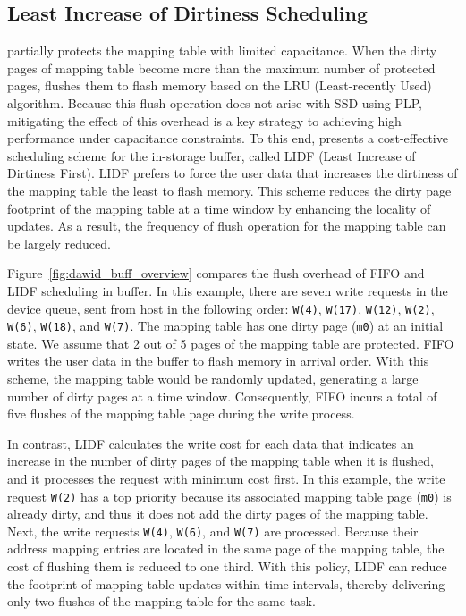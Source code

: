 

\subsection{Least Increase of Dirtiness Scheduling}
\label{subsec:lind_sched}
\ours{} partially protects the mapping table with limited capacitance. 
When the dirty pages of mapping table become more than the maximum number of protected pages, 
\ours{} flushes them to flash memory based on the LRU (Least-recently Used) algorithm. 
Because this flush operation does not arise with SSD using PLP, mitigating the effect of this overhead 
is a key strategy to achieving high performance under capacitance constraints. 
To this end, \ours{} presents a cost-effective scheduling scheme for the in-storage buffer, called LIDF (Least Increase of Dirtiness First). 
LIDF prefers to force the user data that increases the dirtiness of the mapping 
table the least to flash memory. This scheme reduces the dirty page footprint 
of the mapping table at a time window by enhancing the locality of updates. 
As a result, the frequency of flush operation for the mapping table can be 
largely reduced. 

Figure~\ref{fig:dawid_buff_overview} compares the flush overhead of FIFO and LIDF scheduling in \ours{} buffer. 
In this example, there are seven write requests 
in the device queue, sent from host in the following order: \texttt{W(4)}, \texttt{W(17)}, \texttt{W(12)}, \texttt{W(2)}, \texttt{W(6)}, \texttt{W(18)}, and \texttt{W(7)}.  
The mapping table has one dirty page (\texttt{m0}) 
at an initial state. We assume that 2 out of 5 pages of the mapping table are protected. 
FIFO writes the user data in the buffer to flash memory in arrival order. 
With this scheme, the mapping table would be randomly updated, generating a large number of dirty pages at a 
time window. 
Consequently, FIFO incurs a total of five flushes of the mapping table page during the write process. 


In contrast, LIDF calculates the write cost for each data
that indicates an increase in the number of dirty pages of the mapping table when it is flushed, and it processes the request with minimum cost first. 
In this example, the write request \texttt{W(2)} has a top 
priority because its associated mapping table page (\texttt{m0}) is already dirty, and thus it does not add the dirty pages of the mapping table. 
Next, the write requests \texttt{W(4)}, \texttt{W(6)}, and \texttt{W(7)} are processed. 
Because their address mapping entries are located in the same page of the mapping table, the cost of flushing them 
is reduced to one third. 
With this policy, LIDF can reduce the footprint of mapping table updates within time intervals, thereby delivering only two flushes of the mapping table for the same task. 

